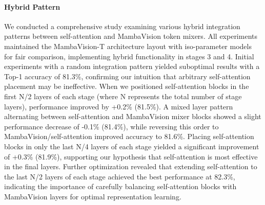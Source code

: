 \documentclass[10pt,twocolumn,letterpaper]{article}
\begin{document}
\paragraph{Hybrid Pattern} We conducted a comprehensive study examining various hybrid integration patterns between self-attention and MambaVision token mixers. All experiments maintained the MambaVision-T architecture layout with iso-parameter models for fair comparison, implementing hybrid functionality in stages 3 and 4. Initial experiments with a random integration pattern yielded suboptimal results with a Top-1 accuracy of 81.3\%, confirming our intuition that arbitrary self-attention placement may be ineffective. When we positioned self-attention blocks in the first N/2 layers of each stage (where N represents the total number of stage layers), performance improved by +0.2\% (81.5\%). A mixed layer pattern alternating between self-attention and MambaVision mixer blocks showed a slight performance decrease of -0.1\% (81.4\%), while reversing this order to MambaVision/self-attention improved accuracy to 81.6\%. Placing self-attention blocks in only the last N/4 layers of each stage yielded a significant improvement of +0.3\% (81.9\%), supporting our hypothesis that self-attention is most effective in the final layers. Further optimization revealed that extending self-attention to the last N/2 layers of each stage achieved the best performance at 82.3\%, indicating the importance of carefully balancing self-attention blocks with MambaVision layers for optimal representation learning.



\begin{table}
\small
    \caption{Systematic design of MambaVision token mixer. w/o and concat refer to "without" and concatenation. Conv1 and conv2 denote the conv operations in the SSM and additional symmetric branch as shown in Fig.~\ref{fig:mamba_vision}. COCO experiments are performed using Mask-RCNN~\cite{he2017mask} head and ×1 LR schedule.
    }
    \label{tab:abl_study1}
\centering
{}
\end{table}
\end{document}
